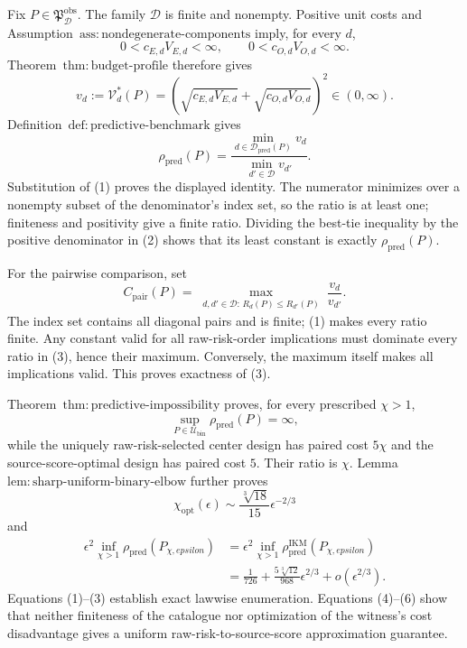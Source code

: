 Fix \(P\in\mathfrak P_{\mathcal D}^{\mathrm{obs}}\). The family \(\mathcal D\) is finite and nonempty. Positive unit costs and Assumption~\(\mathrm{ass{:}nondegenerate\text{-}components}\) imply, for every \(d\),
\[
 0<c_{E,d}V_{E,d}<\infty,
 \qquad 0<c_{O,d}V_{O,d}<\infty.
\]
Theorem~\(\mathrm{thm{:}budget\text{-}profile}\) therefore gives
\[
 v_d:=\mathcal V_d^*(P)
 =(\sqrt{c_{E,d}V_{E,d}}+\sqrt{c_{O,d}V_{O,d}})^2\in(0,\infty). \tag{1}
\]
Definition~\(\mathrm{def{:}predictive\text{-}benchmark}\) gives
\[
 \rho_{\mathrm{pred}}(P)
 =\frac{\min_{d\in\mathcal D_{\mathrm{pred}}(P)}v_d}
 {\min_{d'\in\mathcal D}v_{d'}}. \tag{2}
\]
Substitution of (1) proves the displayed identity. The numerator minimizes over a nonempty subset of the denominator's index set, so the ratio is at least one; finiteness and positivity give a finite ratio. Dividing the best-tie inequality by the positive denominator in (2) shows that its least constant is exactly \(\rho_{\mathrm{pred}}(P)\).

For the pairwise comparison, set
\[
 C_{\mathrm{pair}}(P)
 =\max_{\substack{d,d'\in\mathcal D:\,R_d(P)\le R_{d'}(P)}}
 \frac{v_d}{v_{d'}}. \tag{3}
\]
The index set contains all diagonal pairs and is finite; (1) makes every ratio finite. Any constant valid for all raw-risk-order implications must dominate every ratio in (3), hence their maximum. Conversely, the maximum itself makes all implications valid. This proves exactness of (3).

Theorem~\(\mathrm{thm{:}predictive\text{-}impossibility}\) proves, for every prescribed \(\chi>1\),
\[
 \sup_{P\in\mathcal U_{\mathrm{bin}}}\rho_{\mathrm{pred}}(P)=\infty, \tag{4}
\]
while the uniquely raw-risk-selected center design has paired cost \(5\chi\) and the source-score-optimal design has paired cost \(5\). Their ratio is \(\chi\). Lemma~\(\mathrm{lem{:}sharp\text{-}uniform\text{-}binary\text{-}elbow}\) further proves
\[
 \chi_{\mathrm{opt}}(\epsilon)
 \sim\frac{\sqrt[3]{18}}{15}\epsilon^{-2/3} \tag{5}
\]
and
\[
\begin{aligned}
 \epsilon^2\inf_{\chi>1}\rho_{\mathrm{pred}}(P_{\chi,epsilon})
 &=\epsilon^2\inf_{\chi>1}\rho_{\mathrm{pred}}^{\mathrm{IKM}}(P_{\chi,epsilon})\\
 &=\frac1{726}+\frac{5\sqrt[3]{12}}{968}\epsilon^{2/3}+o(\epsilon^{2/3}). \tag{6}
\end{aligned}
\]
Equations (1)--(3) establish exact lawwise enumeration. Equations (4)--(6) show that neither finiteness of the catalogue nor optimization of the witness's cost disadvantage gives a uniform raw-risk-to-source-score approximation guarantee.